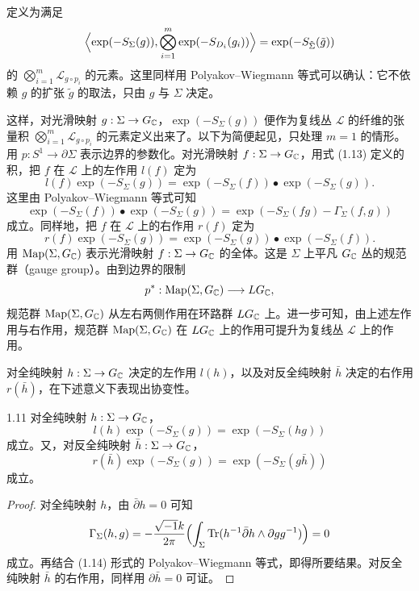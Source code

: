 定义为满足
\[
  \Bigl\langle\exp(-S_\Sigma(g)),\bigotimes_{i=1}^m\exp(-S_{D_i}(g_i))\Bigr\rangle=\exp(-S_{\tilde\Sigma}(\tilde g))
\]
的 $\bigotimes_{i=1}^m\mathcal{L}_{g\circ p_i}$ 的元素。这里同样用 Polyakov--Wiegmann 等式可以确认：它不依赖 $g$ 的扩张 $\tilde g$ 的取法，只由 $g$ 与 $\Sigma$ 决定。

这样，对光滑映射 $g:\Sigma\to G_{\mathbb{C}}$，$\exp(-S_\Sigma(g))$ 便作为复线丛 $\mathcal{L}$ 的纤维的张量积 $\bigotimes_{i=1}^m\mathcal{L}_{g\circ p_i}$ 的元素定义出来了。以下为简便起见，只处理 $m=1$ 的情形。用 $p:S^1\to\partial\Sigma$ 表示边界的参数化。对光滑映射 $f:\Sigma\to G_{\mathbb{C}}$，用式 (1.13) 定义的积，把 $f$ 在 $\mathcal{L}$ 上的左作用 $l(f)$ 定为
\[
  l(f)\exp(-S_\Sigma(g))=\exp(-S_\Sigma(f))\bullet\exp(-S_\Sigma(g)).
\]
这里由 Polyakov--Wiegmann 等式可知
\begin{equation}
  \exp(-S_\Sigma(f))\bullet\exp(-S_\Sigma(g))=\exp(-S_\Sigma(fg)-\Gamma_\Sigma(f,g)) \tag{1.14}
\end{equation}
成立。同样地，把 $f$ 在 $\mathcal{L}$ 上的右作用 $r(f)$ 定为
\[
  r(f)\exp(-S_\Sigma(g))=\exp(-S_\Sigma(g))\bullet\exp(-S_\Sigma(f)).
\]
用 $\operatorname{Map}(\Sigma,G_{\mathbb{C}})$ 表示光滑映射 $f:\Sigma\to G_{\mathbb{C}}$ 的全体。这是 $\Sigma$ 上平凡 $G_{\mathbb{C}}$ 丛的规范群（gauge group）。由到边界的限制
\[
  p^*:\operatorname{Map}(\Sigma,G_{\mathbb{C}})\longrightarrow LG_{\mathbb{C}},
\]
规范群 $\operatorname{Map}(\Sigma,G_{\mathbb{C}})$ 从左右两侧作用在环路群 $LG_{\mathbb{C}}$ 上。进一步可知，由上述左作用与右作用，规范群 $\operatorname{Map}(\Sigma,G_{\mathbb{C}})$ 在 $LG_{\mathbb{C}}$ 上的作用可提升为复线丛 $\mathcal{L}$ 上的作用。

对全纯映射 $h:\Sigma\to G_{\mathbb{C}}$ 决定的左作用 $l(h)$，以及对反全纯映射 $\bar h$ 决定的右作用 $r(\bar h)$，在下述意义下表现出协变性。

\begin{proposition*}{1.11}
对全纯映射 $h:\Sigma\to G_{\mathbb{C}}$，
\[
  l(h)\exp(-S_\Sigma(g))=\exp(-S_\Sigma(hg))
\]
成立。又，对反全纯映射 $\bar h:\Sigma\to G_{\mathbb{C}}$，
\[
  r(\bar h)\exp(-S_\Sigma(g))=\exp(-S_\Sigma(g\bar h))
\]
成立。
\end{proposition*}

\begin{proof}
对全纯映射 $h$，由 $\bar\partial h=0$ 可知
\[
  \Gamma_\Sigma(h,g)=-\frac{\sqrt{-1}k}{2\pi}\Bigl(\int_\Sigma\operatorname{Tr}(h^{-1}\bar\partial h\wedge\partial gg^{-1})\Bigr)=0
\]
成立。再结合 (1.14) 形式的 Polyakov--Wiegmann 等式，即得所要结果。对反全纯映射 $\bar h$ 的右作用，同样用 $\partial\bar h=0$ 可证。
\end{proof}




